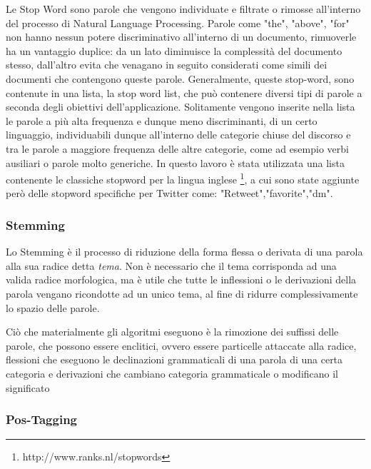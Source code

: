 Le Stop Word sono parole che vengono individuate e filtrate o rimosse all'interno del processo di Natural Language Processing.
Parole come "the", "above", "for" non hanno nessun potere discriminativo all'interno di un documento, rimuoverle ha un vantaggio duplice: da un lato diminuisce la complessità del documento stesso, dall'altro evita che venagano in seguito considerati come simili dei documenti che contengono queste parole.
Generalmente, queste stop-word, sono contenute in una lista, la stop word list, che può contenere diversi tipi di parole a seconda degli obiettivi dell'applicazione. Solitamente vengono inserite nella lista le parole a più alta frequenza e dunque meno discriminanti, di un certo linguaggio, individuabili dunque all'interno delle categorie chiuse del discorso e tra le parole a maggiore frequenza
delle altre categorie, come ad esempio verbi ausiliari o parole molto generiche. In questo lavoro è stata utilizzata una lista contenente le classiche stopword per la lingua inglese \footnote{http://www.ranks.nl/stopwords}, a cui sono state aggiunte però
delle stopword specifiche per Twitter come: "Retweet","favorite","dm".
\subsubsection{Stemming}
Lo Stemming è il processo di riduzione della forma flessa o derivata di una parola alla sua radice detta \emph{tema}. 
Non è necessario che il tema corrisponda ad una valida radice morfologica, ma è utile che tutte le inflessioni o le derivazioni della parola
vengano ricondotte ad un unico tema, al fine di ridurre complessivamente lo spazio delle parole. 

 Ciò che materialmente gli algoritmi eseguono è la rimozione dei suffissi delle parole, che possono essere enclitici, ovvero essere particelle attaccate alla radice, flessioni che eseguono le declinazioni grammaticali di una parola di una certa categoria e derivazioni che cambiano categoria grammaticale o modificano il significato  

\subsubsection{Pos-Tagging}
 
